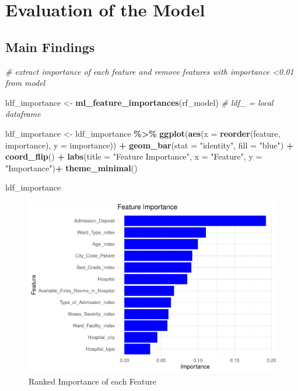 \documentclass[
]{article}
\newenvironment{Shaded}{\begin{snugshade}}{\end{snugshade}}
\newcommand{\AttributeTok}[1]{\textcolor[rgb]{0.13,0.29,0.53}{#1}}
\newcommand{\CommentTok}[1]{\textcolor[rgb]{0.56,0.35,0.01}{\textit{#1}}}
\newcommand{\FunctionTok}[1]{\textcolor[rgb]{0.13,0.29,0.53}{\textbf{#1}}}
\newcommand{\NormalTok}[1]{#1}
\newcommand{\OtherTok}[1]{\textcolor[rgb]{0.56,0.35,0.01}{#1}}
\newcommand{\SpecialCharTok}[1]{\textcolor[rgb]{0.81,0.36,0.00}{\textbf{#1}}}
\newcommand{\StringTok}[1]{\textcolor[rgb]{0.31,0.60,0.02}{#1}}
\begin{document}
\section{Evaluation of the Model}\label{evaluation-of-the-model}

\subsection{Main Findings}\label{main-findings}

\begin{Shaded}
\begin{Highlighting}[]
\CommentTok{\# extract importance of each feature and remove features with importance \textless{}0.01 from model}

\NormalTok{ldf\_importance }\OtherTok{\textless{}{-}} \FunctionTok{ml\_feature\_importances}\NormalTok{(rf\_model)  }\CommentTok{\# ldf\_ = local dataframe}

\NormalTok{ldf\_importance }\OtherTok{\textless{}{-}}\NormalTok{ ldf\_importance }\SpecialCharTok{\%\textgreater{}\%} 
  \FunctionTok{ggplot}\NormalTok{(}\FunctionTok{aes}\NormalTok{(}\AttributeTok{x =} \FunctionTok{reorder}\NormalTok{(feature, importance), }\AttributeTok{y =}\NormalTok{ importance)) }\SpecialCharTok{+}
  \FunctionTok{geom\_bar}\NormalTok{(}\AttributeTok{stat =} \StringTok{"identity"}\NormalTok{, }\AttributeTok{fill =} \StringTok{"blue"}\NormalTok{) }\SpecialCharTok{+}
  \FunctionTok{coord\_flip}\NormalTok{() }\SpecialCharTok{+}
  \FunctionTok{labs}\NormalTok{(}\AttributeTok{title =} \StringTok{"Feature Importance"}\NormalTok{, }\AttributeTok{x =} \StringTok{"Feature"}\NormalTok{, }\AttributeTok{y =} \StringTok{"Importance"}\NormalTok{)}\SpecialCharTok{+}
  \FunctionTok{theme\_minimal}\NormalTok{()}

\NormalTok{ldf\_importance}
\end{Highlighting}
\end{Shaded}

\begin{figure}

{\centering \includegraphics[width=0.9\linewidth]{B273025_final_big_data_rmd_final_files/figure-latex/unnamed-chunk-9-1} 

}

\caption{Ranked Importance of each Feature}\label{fig:unnamed-chunk-9}
\end{figure}
\end{document}
